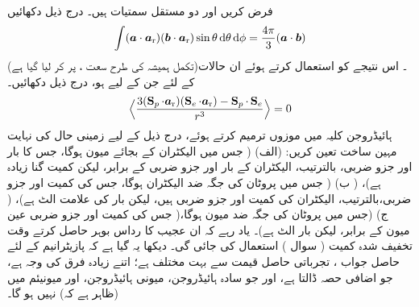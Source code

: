  
فرض کریں  اور  دو مستقل سمتیات ہیں۔ درج ذیل دکھائیں
\begin{align}
 \int(\kvec{a} \cdot \kvec{\kvecsub{a}{r}}) (\kvec{b} \cdot \kvec{\kvecsub{a}{r}}) \sin \theta \dif \theta \dif \phi = \frac{4 \pi}{3} (\kvec{a} \cdot \kvec{b})
\end{align}
(تکمل ہمیشہ کی طرح سعت ، پر کر لیا گیا ہے)۔ اس نتیجے کو استعمال کرتے ہوئے ان حالات کے لئے جن کے لیے  ہو، درج ذیل دکھائیں۔
\begin{align*}
\Big\langle \frac{3 (\operatorname{\mathbf{S}}_p \cdot {\ensuremath{{\boldsymbol{a}}}_{\textup{r}}})(\operatorname{\mathbf{S}}_e \cdot {\ensuremath{{\boldsymbol{a}}}_{\textup{r}}}) - \operatorname{\mathbf{S}}_p \cdot \operatorname{\mathbf{S}}_e}{r^3} \Big \rangle = 0
\end{align*}
  
ہائیڈروجن کلیہ میں موزوں ترمیم کرتے ہوئے، درج ذیل کے لیے زمینی حال کی نہایت مہین ساخت تعین کریں: (الف)  ( جس میں الیکٹران کے بجائے میون ہوگا، جس کا بار اور  جزو ضربی، بالترتیب، الیکٹران کے بار اور  جزو ضربی کے برابر، لیکن کمیت  گنا زیادہ ہے)، ( ب)  ( جس میں پروٹان کی جگہ ضد الیکٹران ہوگا، جس کی کمیت اور  جزو ضربی،بالترتیب، الیکٹران کی کمیت اور  جزو ضربی ہیں، لیکن بار کی علامت الٹ ہے)، ( ج)  (جس میں پروٹان کی جگہ ضد میون ہوگا،( جس کی کمیت اور  جزو ضربی عین میون کے برابر، لیکن بار الٹ ہے)۔  یاد رہے کہ ان عجیب کا رداس بوہر حاصل کرتے وقت تخفیف شدہ کمیت
( سوال ) استعمال کی جائی گی۔ دیکھا یہ گیا ہے کہ پازیٹرانیم کے لئے حاصل جواب ، تجرباتی
 حاصل قیمت  سے بہت مختلف ہے؛ اتنے زیادہ فرق کی وجہ   ہے، جو اضافی  حصہ ڈالتا ہے، اور جو سادہ ہائیڈروجن، میونی ہائیڈروجن، اور میونیئم میں (ظاہر ہے کہ) نہیں ہو گا۔ 


